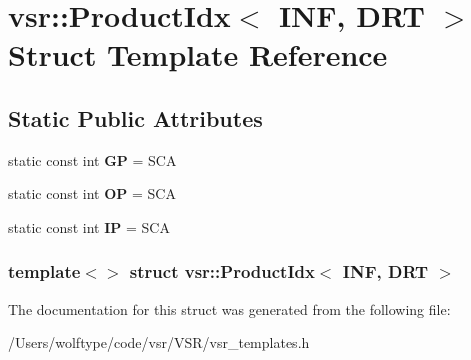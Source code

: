 \hypertarget{structvsr_1_1_product_idx_3_01_i_n_f_00_01_d_r_t_01_4}{\section{vsr\-:\-:Product\-Idx$<$ I\-N\-F, D\-R\-T $>$ Struct Template Reference}
\label{structvsr_1_1_product_idx_3_01_i_n_f_00_01_d_r_t_01_4}
}
\subsection*{Static Public Attributes}
\begin{DoxyCompactItemize}
\item 
\hypertarget{structvsr_1_1_product_idx_3_01_i_n_f_00_01_d_r_t_01_4_ac53b464607a7ddf409589dab8a12be3d}{static const int {\bfseries G\-P} = S\-C\-A}\label{structvsr_1_1_product_idx_3_01_i_n_f_00_01_d_r_t_01_4_ac53b464607a7ddf409589dab8a12be3d}

\item 
\hypertarget{structvsr_1_1_product_idx_3_01_i_n_f_00_01_d_r_t_01_4_a53a3cb70efa9eb611aa0abe28259276b}{static const int {\bfseries O\-P} = S\-C\-A}\label{structvsr_1_1_product_idx_3_01_i_n_f_00_01_d_r_t_01_4_a53a3cb70efa9eb611aa0abe28259276b}

\item 
\hypertarget{structvsr_1_1_product_idx_3_01_i_n_f_00_01_d_r_t_01_4_a145c466e2b1e25b5fa19dddd5bba4a8d}{static const int {\bfseries I\-P} = S\-C\-A}\label{structvsr_1_1_product_idx_3_01_i_n_f_00_01_d_r_t_01_4_a145c466e2b1e25b5fa19dddd5bba4a8d}

\end{DoxyCompactItemize}
\subsubsection*{template$<$$>$ struct vsr\-::\-Product\-Idx$<$ I\-N\-F, D\-R\-T $>$}



The documentation for this struct was generated from the following file\-:\begin{DoxyCompactItemize}
\item 
/\-Users/wolftype/code/vsr/\-V\-S\-R/vsr\-\_\-templates.\-h\end{DoxyCompactItemize}
